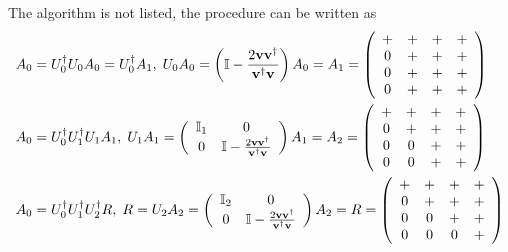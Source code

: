 The algorithm is not listed, the procedure can be written as
\begin{equation}
\begin{split}
&A_0=U_0^{\dagger}U_0A_0=U_0^{\dagger}A_1,\;U_0A_0= \left(\mathbb{I}-\frac{2{\bf v}{\bf v}^{\dagger}}{{\bf v}^{\dagger}{\bf v}}\right)A_0=A_1=\left(\begin{array}{cccc}
+ & + & + & + \\ 0 & + & + & + \\ 0 & + & + & + \\ 0 & + & + & +\end{array}\right)\\
&A_0=U_0^{\dagger}U_1^{\dagger}U_1A_1,\; U_1A_1=\left(\begin{array}{cc}\mathbb{I}_1 & 0 \\ 0 & \mathbb{I}-\frac{2{\bf v}{\bf v}^{\dagger}}{{\bf v}^{\dagger}{\bf v}} \end{array}\right)A_1=A_2=\left(\begin{array}{cccc}
+ & + & + & + \\ 0 & + & + & + \\ 0 & 0 & + & + \\ 0 & 0 & + & +\end{array}\right)\\
&A_0=U_0^{\dagger}U_1^{\dagger}U_2^{\dagger}R,\; R=U_2A_2=\left(\begin{array}{cc}\mathbb{I}_2 & 0 \\ 0 & \mathbb{I}-\frac{2{\bf v}{\bf v}^{\dagger}}{{\bf v}^{\dagger}{\bf v}} \end{array}\right)A_2=R=\left(\begin{array}{cccc}
+ & + & + & + \\ 0 & + & + & + \\ 0 & 0 & + & + \\ 0 & 0 & 0 & +\end{array}\right)\\
\end{split}
\end{equation}


